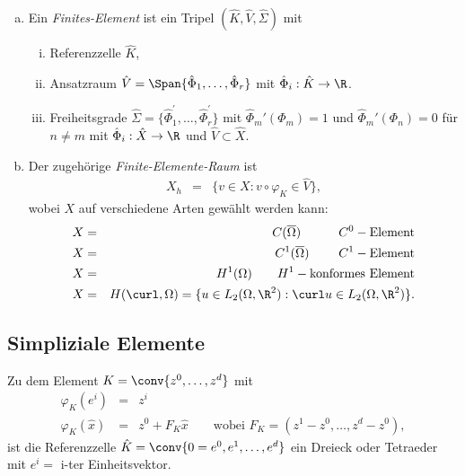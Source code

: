 \begin{Definition}
    \label{def:4.3}
    \begin{enumerate}[a)]
        \item
          Ein \emph{Finites-Element} ist ein Tripel
          $(\hat K, \hat V, \hat \Sigma)$
          mit
          \begin{enumerate}[i)]
              \item
                Referenzzelle $\hat K$,
              \item
                Ansatzraum $\hat V = \Span\{\hat{\Phi}_1, \dots, \hat{\Phi}_r\}$
                mit $\hat{\Phi}_i: \hat K \to \R$.
              \item
                Freiheitsgrade $\hat\Sigma = \{\hat{\Phi}_1^\prime, \dots,
                \hat{\Phi}_r^\prime\}$ mit $\hat \Phi_m'(\Phi_m) = 1$ 
                und $\hat \Phi_m'(\Phi_n) = 0$ für $n\neq m$
                mit $\hat{\Phi}_i: \hat X \to \R$ und $\hat V \subset \hat X$.
          \end{enumerate}
        \item
          Der zugehörige \emph{Finite-Elemente-Raum} ist
          \begin{eqnarray*}
              X_h &=& \{v\in X: v \circ \varphi_K \in \hat V\},
          \end{eqnarray*}
          wobei $X$ auf verschiedene Arten gewählt werden kann:
          \begin{eqnarray*}
              X &=& C(\overline\Omega) \qquad \ \ \ C^0-\text{Element} \\
              X &=& C^1(\overline\Omega) \qquad \ C^1-\text{Element} \\
              X &=& H^1(\Omega) \qquad H^1-\text{konformes Element} \\
              X &=& H(\curl,\Omega) = \{u\in L_2(\Omega, \R^2): \curl u \in
                    L_2(\Omega, \R^2)\}.
          \end{eqnarray*}
    \end{enumerate}
\end{Definition}


\subsection{Simpliziale Elemente}


Zu dem Element $K = \conv\{z^0, \dots, z^d\}$ mit
\begin{eqnarray*}
    \varphi_K(e^i) &=& z^i \\
    \varphi_K(\hat x) &=& z^0 + F_K \hat x
    \qquad \text{wobei } F_K = (z^1 - z^0, \dots,  z^d - z^0),
\end{eqnarray*}
ist die Referenzzelle $\hat K = \conv\{0 = e^0, e^1, \dots, e^d\}$ ein Dreieck
oder Tetraeder mit $e^i =$ i-ter Einheitsvektor. 

